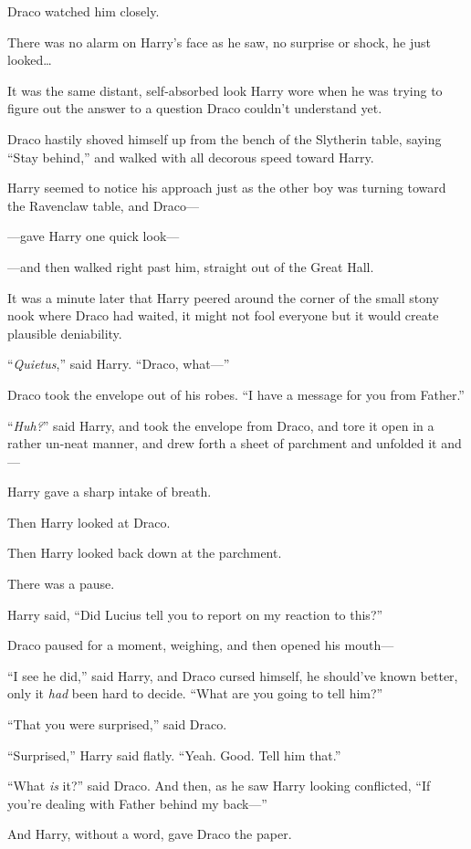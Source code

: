 Draco watched him closely.

There was no alarm on Harry’s face as he saw, no surprise or shock, he just looked…

It was the same distant, self-absorbed look Harry wore when he was trying to figure out the answer to a question Draco couldn’t understand yet.

Draco hastily shoved himself up from the bench of the Slytherin table, saying “Stay behind,” and walked with all decorous speed toward Harry.

Harry seemed to notice his approach just as the other boy was turning toward the Ravenclaw table, and Draco—

—gave Harry one quick look—

—and then walked right past him, straight out of the Great Hall.

It was a minute later that Harry peered around the corner of the small stony nook where Draco had waited, it might not fool everyone but it would create plausible deniability.

“\emph{Quietus},” said Harry. “Draco, what—”

Draco took the envelope out of his robes. “I have a message for you from Father.”

“\emph{Huh?}” said Harry, and took the envelope from Draco, and tore it open in a rather un-neat manner, and drew forth a sheet of parchment and unfolded it and—

Harry gave a sharp intake of breath.

Then Harry looked at Draco.

Then Harry looked back down at the parchment.

There was a pause.

Harry said, “Did Lucius tell you to report on my reaction to this?”

Draco paused for a moment, weighing, and then opened his mouth—

“I see he did,” said Harry, and Draco cursed himself, he should’ve known better, only it \emph{had} been hard to decide. “What are you going to tell him?”

“That you were surprised,” said Draco.

“Surprised,” Harry said flatly. “Yeah. Good. Tell him that.”

“What \emph{is} it?” said Draco. And then, as he saw Harry looking conflicted, “If you’re dealing with Father behind my back—”

And Harry, without a word, gave Draco the paper.

